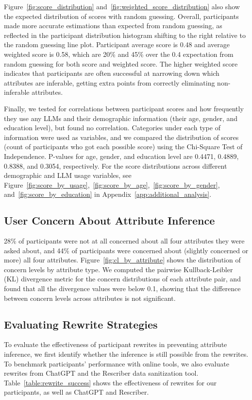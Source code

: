 Figure~\ref{fig:score_distribution} and~\ref{fig:weighted_score_distribution} also show the expected distribution of scores with random guessing. Overall, participants made more accurate estimations than expected from random guessing, as reflected in the participant distribution histogram shifting to the right relative to the random guessing line plot. Participant average score is 0.48 and average weighted score is 0.58, which are 20\% and 45\% over the 0.4 expectation from random guessing for both score and weighted score. The higher weighted score indicates that participants are often successful at narrowing down which attributes are inferable, getting extra points from correctly eliminating non-inferable attributes.

Finally, we tested for correlations between participant scores and how frequently they use any LLMs and their demographic information (their age, gender, and education level), but found no correlation. Categories under each type of information were used as variables, and we compared the distribution of scores (count of participants who got each possible score) using the Chi-Square Test of Independence. P-values for age, gender, and education level are 0.4471, 0.4889, 0.8388, and 0.3054, respectively. For the score distributions across different demographic and LLM usage variables, see Figure~\ref{fig:score_by_usage},~\ref{fig:score_by_age},~\ref{fig:score_by_gender}, and~\ref{fig:score_by_education} in Appendix~\ref{app:additional_analysis}.


\subsection{User Concern About Attribute Inference}\label{sec:user_concern}

28\% of participants were not at all concerned about all four attributes they were asked about, and 44\% of participants were concerned about (slightly concerned or more) all four attributes. Figure~\ref{fig:cl_by_attribute} shows the distribution of concern levels by attribute type. We computed the pairwise Kullback-Leibler (KL) divergence metric for the concern distributions of each attribute pair, and found that all the divergence values were below 0.1, showing that the difference between concern levels across attributes is not significant.


\subsection{Evaluating Rewrite Strategies}
To evaluate the effectiveness of participant rewrites in preventing attribute inference, we first identify whether the inference is still possible from the rewrites. To benchmark participants' performance with online tools, we also evaluate rewrites from ChatGPT and the Rescriber data sanitization tool. 
Table~\ref{table:rewrite_success} shows the effectiveness of rewrites for our participants, as well as ChatGPT and Rescriber.


